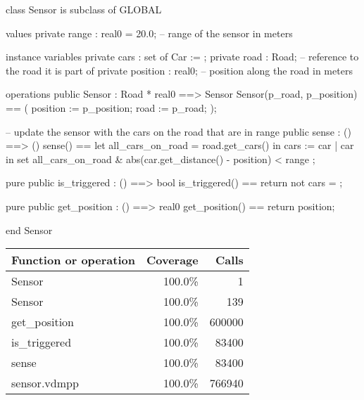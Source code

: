 \documentclass[a4paper]{article}
\begin{document}
\title{}
\author{}
\begin{vdm_al}
class Sensor is subclass of GLOBAL

values
    private range : real0 = 20.0; -- range of the sensor in meters

instance variables
    private cars : set of Car := {};
    private road : Road; -- reference to the road it is part of
    private position : real0; -- position along the road in meters

operations
    public Sensor : Road * real0 ==> Sensor
    Sensor(p_road, p_position) == (
        position := p_position;
        road := p_road;
    );

    -- update the sensor with the cars on the road that are in range
    public sense : () ==> ()
    sense() ==
        let all_cars_on_road = road.get_cars() in
        cars := {
            car
            | car in set all_cars_on_road
            & abs(car.get_distance() - position) < range
        };

    pure public is_triggered : () ==> bool
    is_triggered() == return not cars = {};

    pure public get_position : () ==> real0
    get_position() == return position;

end Sensor
\end{vdm_al}
\bigskip
\begin{longtable}{|l|r|r|}
\hline
Function or operation & Coverage & Calls \\
\hline
\hline
Sensor & 100.0\% & 1 \\
\hline
Sensor & 100.0\% & 139 \\
\hline
get\_position & 100.0\% & 600000 \\
\hline
is\_triggered & 100.0\% & 83400 \\
\hline
sense & 100.0\% & 83400 \\
\hline
\hline
sensor.vdmpp & 100.0\% & 766940 \\
\hline
\end{longtable}
\end{document}
